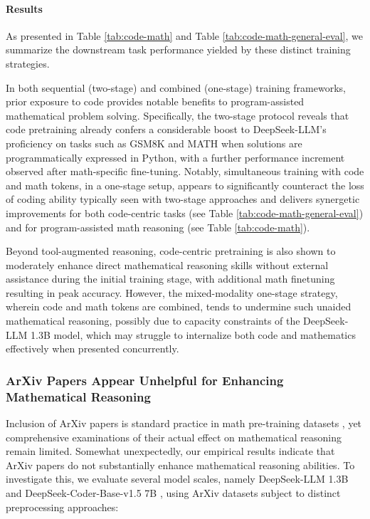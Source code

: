 \paragraph{Results}
As presented in Table \ref{tab:code-math} and Table \ref{tab:code-math-general-eval}, we summarize the downstream task performance yielded by these distinct training strategies.

In both sequential (two-stage) and combined (one-stage) training frameworks, prior exposure to code provides notable benefits to program-assisted mathematical problem solving. Specifically, the two-stage protocol reveals that code pretraining already confers a considerable boost to DeepSeek-LLM’s proficiency on tasks such as GSM8K and MATH when solutions are programmatically expressed in Python, with a further performance increment observed after math-specific fine-tuning. Notably, simultaneous training with code and math tokens, in a one-stage setup, appears to significantly counteract the loss of coding ability typically seen with two-stage approaches and delivers synergetic improvements for both code-centric tasks (see Table \ref{tab:code-math-general-eval}) and for program-assisted math reasoning (see Table \ref{tab:code-math}).

Beyond tool-augmented reasoning, code-centric pretraining is also shown to moderately enhance direct mathematical reasoning skills without external assistance during the initial training stage, with additional math finetuning resulting in peak accuracy. However, the mixed-modality one-stage strategy, wherein code and math tokens are combined, tends to undermine such unaided mathematical reasoning, possibly due to capacity constraints of the DeepSeek-LLM 1.3B model, which may struggle to internalize both code and mathematics effectively when presented concurrently.

\subsubsection{ArXiv Papers Appear Unhelpful for Enhancing Mathematical Reasoning}

Inclusion of ArXiv papers is standard practice in math pre-training datasets \citep{minerva,gpt-f,llemma,mathpile}, yet comprehensive examinations of their actual effect on mathematical reasoning remain limited. Somewhat unexpectedly, our empirical results indicate that ArXiv papers do not substantially enhance mathematical reasoning abilities. To investigate this, we evaluate several model scales, namely DeepSeek-LLM 1.3B and DeepSeek-Coder-Base-v1.5 7B \citep{deepseek-coder}, using ArXiv datasets subject to distinct preprocessing approaches:

